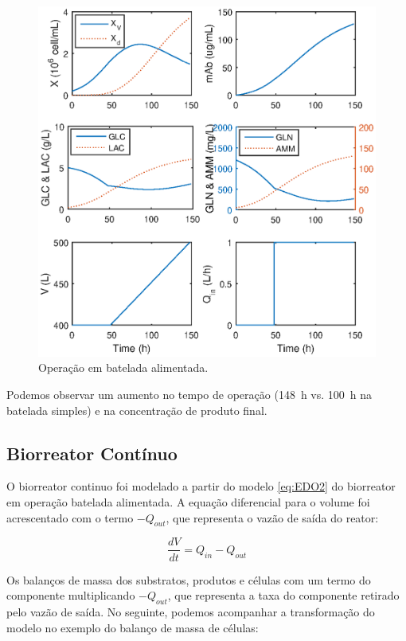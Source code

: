 \documentclass[fleqn,10pt]{SelfArx} %
\begin{document}
\begin{figure}[ht]\centering
\includegraphics[width=\linewidth]{model2}
\caption{Operação em batelada alimentada.}
\label{fig:model2}
\end{figure}

Podemos observar um aumento no tempo de operação (\SI{148}{h} vs. \SI{100}{h} na batelada simples) e na concentração de produto final.

\subsection{Biorreator Contínuo} \label{continuo}

O biorreator continuo foi modelado a partir do modelo \ref{eq:EDO2} do biorreator em operação batelada alimentada. A equação diferencial para o volume foi acrescentado com o termo $-Q_{out}$, que representa o vazão de saída do reator:

\begin{equation}
	\frac{dV}{dt} = Q_{in} - Q_{out} \label{eq:Vcont}
\end{equation}

Os balanços de massa dos substratos, produtos e células com um termo do componente multiplicando $-Q_{out}$, que representa a taxa do componente retirado pelo vazão de saída. No seguinte, podemos acompanhar a transformação do modelo no exemplo do balanço de massa de células:
\end{document}

